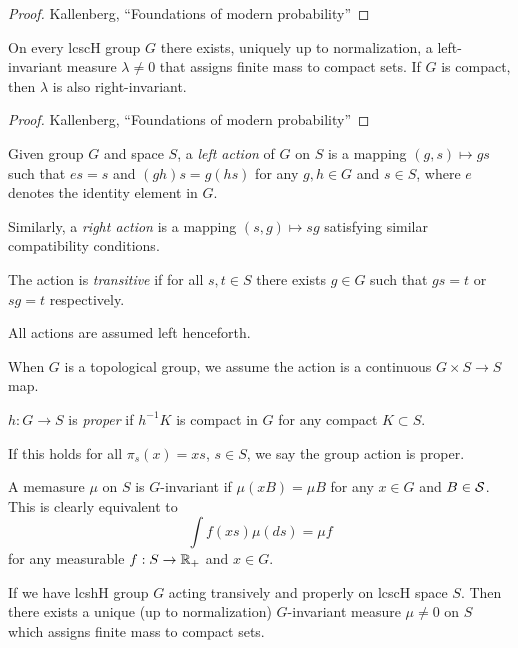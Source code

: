\begin{proof}
  Kallenberg, ``Foundations of modern probability''
\end{proof}

\begin{theorem}
  On every lcscH group $G$ there exists, uniquely up to normalization,
  a left-invariant measure $\lambda \neq 0$ that assigns finite mass to
  compact sets.
  If $G$ is compact, then $\lambda$ is also right-invariant.
\end{theorem}

\begin{proof}
  Kallenberg, ``Foundations of modern probability''
\end{proof}

\begin{definition}
  Given group $G$ and space $S$, a \emph{left action}
  of $G$ on $S$ is a mapping $(g,s) \mapsto gs$ such that $es = s$
  and $(gh)s = g (hs)$ for any $g,h \in G$ and $s \in S$,
  where $e$ denotes the identity element in $G$.

  Similarly, a \emph{right action} is a mapping $(s,g) \mapsto s g$
  satisfying similar compatibility conditions.

  The action is \emph{transitive} if for all $s,t \in S$ there
  exists $g \in G$ such that $g s = t$ or $s g = t$ respectively.

  All actions are assumed left henceforth.
\end{definition}

When $G$ is a topological group, we assume the action is
a continuous $G \times S \to S$ map.

\begin{definition}
  $h : G \to S$ is \emph{proper} if $h^{-1} K$ is
  compact in $G$ for any compact $K \subset S$.

  If this holds for all $\pi_s(x) = x s$, $s \in S$,
  we say the group action is proper.
\end{definition}

\begin{definition}
  A memasure $\mu$ on $S$ is $G$-invariant if
  $\mu(xB) = \mu B$ for any $x \in G$
  and $B \in \mathcal{S}$. This is clearly equivalent to
  \[
    \int f(xs) \mu(ds) = \mu f
  \]
  for any measurable $f : S \to \mathbb{R}_+$ and $x \in G$.
\end{definition}

\begin{theorem}
  If we have lcshH group $G$ acting transively and properly on lcscH space $S$.
  Then there exists a unique (up to normalization) $G$-invariant
  measure $\mu \neq 0$ on $S$ which assigns finite mass to compact sets.
\end{theorem}

